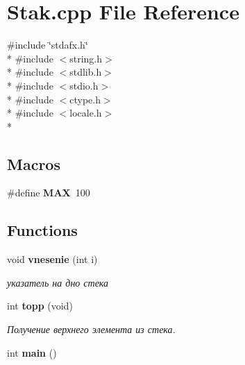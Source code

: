 \section{Stak.\-cpp File Reference}
\label{_stak_8cpp}
{\ttfamily \#include \char`\"{}stdafx.\-h\char`\"{}}\\*
{\ttfamily \#include $<$string.\-h$>$}\\*
{\ttfamily \#include $<$stdlib.\-h$>$}\\*
{\ttfamily \#include $<$stdio.\-h$>$}\\*
{\ttfamily \#include $<$ctype.\-h$>$}\\*
{\ttfamily \#include $<$locale.\-h$>$}\\*
\subsection*{Macros}
\begin{DoxyCompactItemize}
\item 
\#define {\bfseries M\-A\-X}~100\label{_stak_8cpp_a392fb874e547e582e9c66a08a1f23326}

\end{DoxyCompactItemize}
\subsection*{Functions}
\begin{DoxyCompactItemize}
\item 
void {\bf vnesenie} (int i)
\begin{DoxyCompactList}\small\item\em указатель на дно стека \end{DoxyCompactList}\item 
int {\bf topp} (void)
\begin{DoxyCompactList}\small\item\em Получение верхнего элемента из стека. \end{DoxyCompactList}\item 
int {\bf main} ()
\end{DoxyCompactItemize}
